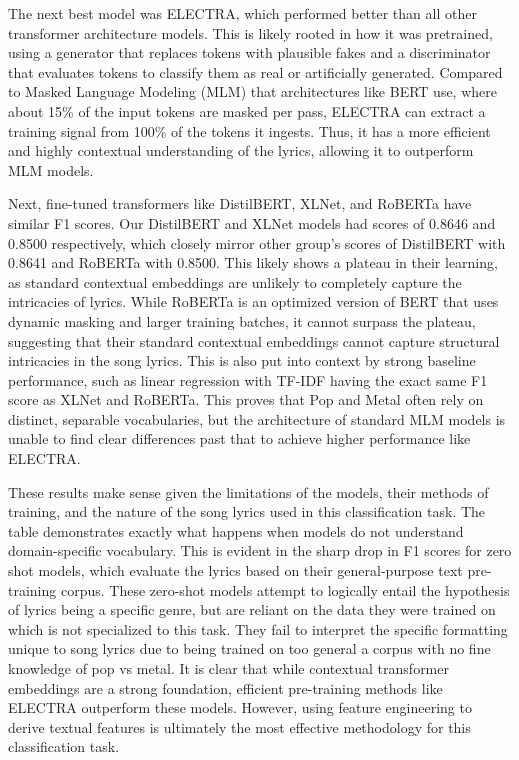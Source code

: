 The next best model was ELECTRA, which performed better than all other transformer architecture models.
This is likely rooted in how it was pretrained, using a generator that replaces tokens with plausible fakes and a discriminator that evaluates tokens to classify them as real or artificially generated.
Compared to Masked Language Modeling (MLM) that architectures like BERT use, where about 15\% of the input tokens are masked per pass, ELECTRA can extract a training signal from 100\% of the tokens it ingests.
Thus, it has a more efficient and highly contextual understanding of the lyrics, allowing it to outperform MLM models.

Next, fine-tuned transformers like DistilBERT, XLNet, and RoBERTa have similar F1 scores.
Our DistilBERT and XLNet models had scores of 0.8646 and 0.8500 respectively, which closely mirror other group's scores of DistilBERT with 0.8641 and RoBERTa with 0.8500.
This likely shows a plateau in their learning, as standard contextual embeddings are unlikely to completely capture the intricacies of lyrics.
While RoBERTa is an optimized version of BERT that uses dynamic masking and larger training batches, it cannot surpass the plateau, suggesting that their standard contextual embeddings cannot capture structural intricacies in the song lyrics.
This is also put into context by strong baseline performance, such as linear regression with TF-IDF having the exact same F1 score as XLNet and RoBERTa.
This proves that Pop and Metal often rely on distinct, separable vocabularies, but the architecture of standard MLM models is unable to find clear differences past that to achieve higher performance like ELECTRA.

These results make sense given the limitations of the models, their methods of training, and the nature of the song lyrics used in this classification task.
The table demonstrates exactly what happens when models do not understand domain-specific vocabulary.
This is evident in the sharp drop in F1 scores for zero shot models, which evaluate the lyrics based on their general-purpose text pre-training corpus.
These zero-shot models attempt to logically entail the hypothesis of lyrics being a specific genre, but are reliant on the data they were trained on which is not specialized to this task.
They fail to interpret the specific formatting unique to song lyrics due to being trained on too general a corpus with no fine knowledge of pop vs metal.
It is clear that while contextual transformer embeddings are a strong foundation, efficient pre-training methods like ELECTRA outperform these models.
However, using feature engineering to derive textual features is ultimately the most effective methodology for this classification task.
